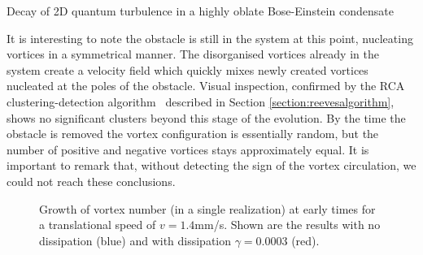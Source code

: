 \begin{chapter}{\label{cha:shin}Decay of 2D quantum turbulence in a highly oblate Bose-Einstein condensate}

It is interesting to note the obstacle is still in the system 
at this point, nucleating vortices in a symmetrical manner. 
The disorganised vortices already in the system create a velocity 
field which quickly mixes newly created vortices nucleated at the
poles of the obstacle. Visual inspection, confirmed by the RCA clustering-detection algorithm~\citep{white12,reeves_billam_13} described in Section \ref{section:reevesalgorithm}, 
shows no significant clusters beyond this stage of the evolution. 
By the time the obstacle is removed the vortex configuration is 
essentially random, but 
the number of positive and negative vortices stays approximately equal.
It is important to remark that, without detecting the sign of the vortex circulation, we
could not reach these conclusions.

\begin{figure}
\begin{center}
\end{center}
\caption{\label{fig:N_vTime} Growth of vortex number (in a single realization) at early times for a translational speed of $v=1.4$mm/s. Shown are the results with no dissipation (blue) and with dissipation $\gamma=0.0003$ (red).}
\end{figure}


\end{chapter}
